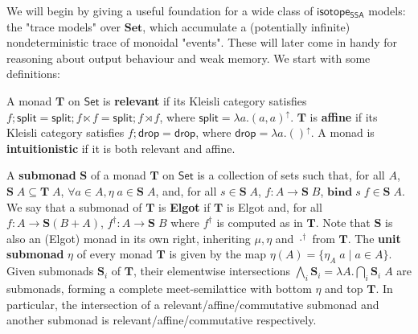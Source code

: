 \documentclass[acmsmall,screen,review]{acmart}
\newcommand{\mb}[1]{\ensuremath{\mathbf{#1}}}
\newcommand{\ms}[1]{\ensuremath{\mathsf{#1}}}
\newcommand{\upg}[2]{{#1}^{\uparrow #2}}
\newcommand{\isotopessa}{\ms{isotope_{SSA}}}
\begin{document}
\label{ssec:trace-monads}

We will begin by giving a useful foundation for a wide class of \isotopessa
models: the "trace models" over \(\mb{Set}\), which accumulate a (potentially
infinite) nondeterministic trace of monoidal "events". These will later come in
handy for reasoning about output behaviour and weak memory. We start with some
definitions:
\begin{definition}
  A monad \(\mb{T}\) on \(\ms{Set}\) is \textbf{relevant} if its Kleisli
  category satisfies \(f;\ms{split} = \ms{split};f \ltimes f = \ms{split};f
  \rtimes f\), where \(\ms{split} = \upg{\lambda a. (a, a)}{}\). \(\mb{T}\) is
  \textbf{affine} if its Kleisli category satisfies \(f;\ms{drop} = \ms{drop}\),
  where \(\ms{drop} = \upg{\lambda a.()}{}\). A monad is \textbf{intuitionistic}
  if it is both relevant and affine.
\end{definition}
\begin{definition}[Submonad] 
  A \textbf{submonad} \(\mb{S}\) of a monad \(\mb{T}\) on \(\ms{Set}\) is a
  collection of sets such that, for all \(A\), \(\mb{S}\;A \subseteq
  \mb{T}\;A\), \(\forall a \in A, \eta\;a \in \mb{S}\;A\), and, for all \(s \in
  \mb{S}\;A\), \(f: A \to \mb{S}\;B\), \(\mb{bind}\;s\;f \in \mb{S}\;A\). We say
  that a submonad of \(\mb{T}\) is \textbf{Elgot} if \(\mb{T}\) is Elgot and,
  for all \(f: A \to \mb{S}(B + A)\), \(f^\dagger: A \to \mb{S}\;B\) where
  \(f^\dagger\) is computed as in \(\mb{T}\). Note that \(\mb{S}\) is also an
  (Elgot) monad in its own right, inheriting \(\mu, \eta\) and \(\cdot^\dagger\)
  from \(\mb{T}\). The \textbf{unit submonad} \(\eta\) of every monad \(\mb{T}\)
  is given by the map \(\eta(A) = \{\eta_A\;a \mid a \in A\}\). Given submonads
  \(\mb{S}_i\) of \(\mb{T}\), their elementwise intersections
  \(\bigwedge_i\mb{S}_i = \lambda A. \bigcap_i \mb{S}_i\;A\) are submonads,
  forming a complete meet-semilattice with bottom \(\eta\) and top \(\mb{T}\).
  In particular, the intersection of a relevant/affine/commutative submonad and
  another submonad is relevant/affine/commutative respectively.
\end{definition}
\end{document}
